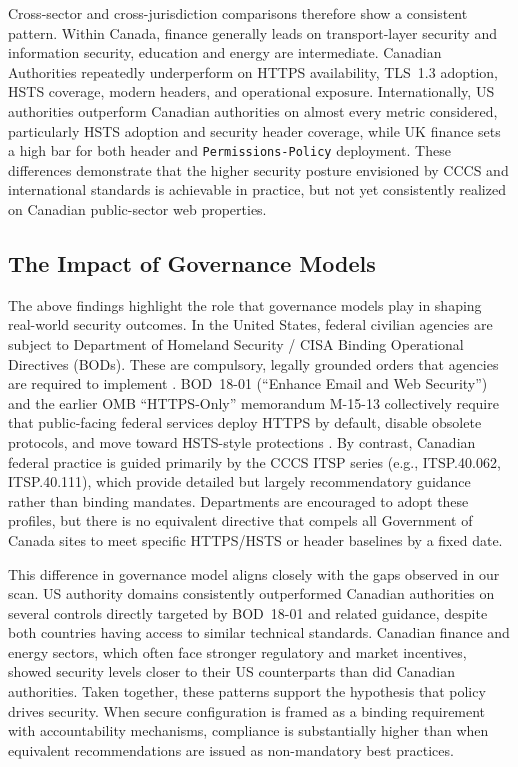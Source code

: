 \documentclass[pdflatex,sn-mathphys-num]{sn-jnl}
\numberwithin{equation}{section}
\theoremstyle{thmstyleone}
\theoremstyle{thmstyletwo}%
\theoremstyle{thmstylethree}%
\begin{document}
\vspace{1em}Cross-sector and cross-jurisdiction comparisons therefore show a consistent pattern. Within 
Canada, finance generally leads on transport-layer security and information security, education and energy 
are intermediate. Canadian Authorities repeatedly underperform on HTTPS availability, TLS~1.3 adoption, HSTS 
coverage, modern headers, and operational exposure. Internationally, US authorities outperform Canadian 
authorities on almost every metric considered, particularly HSTS adoption and security header coverage, while 
UK finance sets a high bar for both header and \texttt{Permissions-Policy} deployment. These differences 
demonstrate that the higher security posture envisioned by CCCS and international standards is achievable in 
practice, but not yet consistently realized on Canadian public-sector web properties.

\subsection{The Impact of Governance Models}

\vspace{1em}The above findings highlight the role that governance models play in shaping real-world security outcomes. 
In the United States, federal civilian agencies are subject to Department of Homeland Security / CISA 
Binding Operational Directives (BODs). These are compulsory, legally grounded orders that agencies are 
required to implement \cite{BOD-20-01, GAO-20-133}. BOD~18-01 (``Enhance Email
and Web Security'') and the earlier OMB ``HTTPS-Only'' memorandum M-15-13 collectively require that public-facing 
federal services deploy HTTPS by default, disable obsolete protocols, and move toward HSTS-style protections
\cite{cisa_bod_18_01,omb-m-15-13}. By contrast, 
Canadian federal practice is guided primarily by the CCCS ITSP series (e.g., ITSP.40.062, ITSP.40.111), 
which provide detailed but largely recommendatory guidance rather than binding mandates.
\cite{cccs-itsp-40062,cccs_itsp_40_111} Departments are encouraged to adopt 
these profiles, but there is no equivalent directive that compels all Government of Canada sites to
meet specific HTTPS/HSTS or header baselines by a fixed date.

\vspace{1em}This difference in governance model aligns closely with the gaps observed in our scan. 
US authority domains consistently outperformed Canadian authorities on several controls directly targeted by 
BOD~18-01 and related guidance, despite both countries having access to 
similar technical standards. Canadian finance and energy sectors, which often face stronger regulatory and
market incentives, showed security levels closer to their US counterparts than did Canadian authorities. 
Taken together, these patterns support the hypothesis that policy drives
security. When secure configuration is framed as a binding requirement with accountability
mechanisms, compliance is substantially higher than when equivalent recommendations are issued as
non-mandatory best practices.
\end{document}

